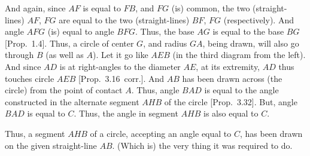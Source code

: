 \begin{Parallel}{}{}
{And again, since $AF$ is equal to $FB$, and $FG$ (is) common, the two (straight-lines) $AF$, $FG$ are equal to the two (straight-lines) $BF$, $FG$ (respectively).
And angle $AFG$ (is) equal to angle $BFG$. Thus, the base $AG$ is equal to
the base $BG$ [Prop.~1.4]. Thus, a circle of center $G$, and radius $GA$,
being drawn, will also go through $B$ (as well as $A$). Let it go like $AEB$ (in the third diagram
from the left). And since $AD$ is at right-angles to the diameter $AE$, at its extremity, $AD$ thus touches circle $AEB$ [Prop.~3.16~corr.]. And $AB$ has been drawn across (the circle) from the point of contact $A$. Thus, angle $BAD$ is equal to the angle constructed in the alternate segment $AHB$ of the circle 
[Prop.~3.32]. But, angle $BAD$ is equal to $C$. Thus, the angle in segment
$AHB$ is also equal to $C$.

Thus, a segment $AHB$ of a circle, accepting an angle equal to $C$, has been
drawn on the given straight-line $AB$. (Which is) the very thing
it was required to do.}
\end{Parallel}

